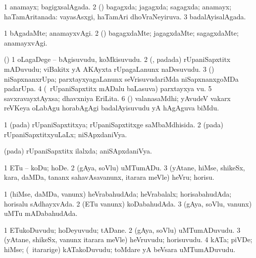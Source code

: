 \bentry
{}
\gl{\gu}
\bmng
\bnum
\num{1} anamayx; bagigxsalAgada. 
\num{2} (\rUpa) bagagxda; jagagxda; sagagxda; anamayx; haTamAritanada:  vayasAsxgi, haTamAri dhoVraNeyiruva. 
\num{3} badalAyisalAgada. 
\enum
\emng
\eentry

\bentry
{}
\gl{\kirxvi}
\bmng
\bnum
\num{1} bAgadaMte; anamayxvAgi. 
\num{2} (\rUpa) bagagxdaMte; jagagxdaMte; sagagxdaMte; anamayxvAgi. 
\enum
\emng
\eentry

\bentry
{}
\gl{\nA}
\bmng
(\birx) 
\bnum
\num{1} oLagaDege -- bAgisuvudu, koMkisuvudu. 
\num{2} (\vAyx, padada) rUpaniSapxtitx mADuvudu; viBakitx yA AKAyxta rUpagaLanunx naDesuvudu. 
\num{3} (\vAyx) niSapxnanxrUpa; parxtayxyagaLanunx seVrisuvudariMda niSapxnanxgoMDa padarUpa. 
\num{4} (\vAyx\ rUpaniSapxtitx mADalu baLasuva) parxtayxya \mo vu. 
\num{5} savxravayxtAyxsa; dhavxniya EriLita. 
\num{6} (\jAyx) valanasaMdhi; yAvudeV vakarx reVKeya oLabAgu horabAgAgi badalAyisuvudu yA hAgAguva biMdu. 
\enum
\emng
\eentry

\bentry
{}
\gl{\gu}
\bmng
\bnum
\num{1} (pada) rUpaniSapxtitxya; rUpaniSapxtitxge saMbaMdhisida. 
\num{2} (pada) rUpaniSapxtitxyuLaLx; niSApxdaniVya. 
\enum
\emng
\eentry

\bentry
{}
\gl{\gu}
\bmng
(pada) rUpaniSapxtitx ilalxda; aniSApxdaniVya. 
\emng
\eentry

\bentry
{}
\gl{\sakirx}
\bmng
\bnum
\num{1} ETu -- koDu; hoDe. 
\num{2} (gAya, soVlu) uMTumADu. 
\num{3} (yAtane, hiMse, shikeSx, kara, daMDa, tananx sahavAsavanunx, itarara meVle) heVru; horisu. 
\enum
\emng
\eentry

\bentry
{}
\gl{\gu}
\bmng
\bnum
\num{1} (hiMse, daMDa, \mo vanunx) heVrabahudAda; heVrabalalx; horisabahudAda; horisalu sAdhayxvAda. 
\num{2} (ETu \mo vanunx) koDabahudAda. 
\num{3} (gAya, soVlu, \mo vanunx) uMTu mADabahudAda. 
\enum
\emng
\eentry

\bentry
{}
\gl{\nA}
\bmng
\bnum
\num{1} ETukoDuvudu; hoDeyuvudu; tADane. 
\num{2} (gAya, soVlu) uMTumADuvudu. 
\num{3} (yAtane, shikeSx, \mo vanunx itarara meVle) heVruvudu; horisuvudu. 
\num{4} kATa; piVDe; hiMse; (\kanmu\ itararige) kATakoDuvudu; toMdare yA beVsara uMTumADuvudu. 
\enum
\emng
\eentry


